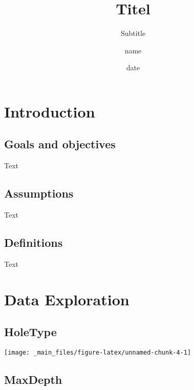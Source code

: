 \documentclass[
]{article}
\title{Titel}
\subtitle{Subtitle}
\author{name}
\date{date}
\begin{document}
\NoBgThispage %

\maketitle



{
\setcounter{tocdepth}{3}
\tableofcontents
}
\hypertarget{introduction}{%
\section{Introduction}\label{introduction}}

\hypertarget{goals-and-objectives}{%
\subsection{Goals and objectives}\label{goals-and-objectives}}

Text

\hypertarget{assumptions}{%
\subsection{Assumptions}\label{assumptions}}

Text

\hypertarget{definitions}{%
\subsection{Definitions}\label{definitions}}

Text

\newpage

\newpage

\hypertarget{data-exploration}{%
\section{Data Exploration}\label{data-exploration}}

\hypertarget{holetype}{%
\subsection{HoleType}\label{holetype}}

\begin{center}\texttt{[image: \_main\_files/figure-latex/unnamed-chunk-4-1]} \end{center}

\hypertarget{maxdepth}{%
\subsection{MaxDepth}\label{maxdepth}}
\end{document}
